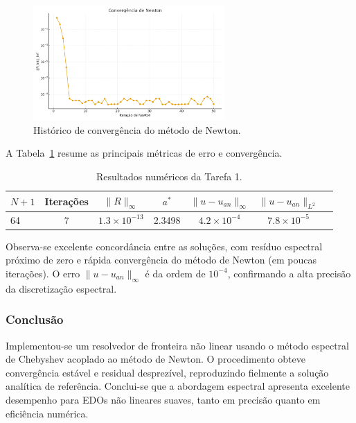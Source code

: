 \documentclass[12pt,a4paper]{article}
\begin{document}
\begin{figure}[H]
    \centering
    \includegraphics[width=0.65\textwidth]{figures/newton_convergence.png}
    \caption{Histórico de convergência do método de Newton.}
    \label{fig:newton}
\end{figure}

A Tabela~\ref{tab:bvp_resultados} resume as principais métricas de erro e convergência.

\begin{table}[H]
\centering
\caption{Resultados numéricos da Tarefa 1.}
\label{tab:bvp_resultados}
\begin{tabular}{lcccccc}
\toprule
$N{+}1$ & Iterações & $\|R\|_\infty$ & $a^*$ & $\|u-u_{an}\|_\infty$ & $\|u-u_{an}\|_{L^2}$ \\
\midrule
64 & 7 & $1.3\times10^{-13}$ & 2.3498 & $4.2\times10^{-4}$ & $7.8\times10^{-5}$\\
\bottomrule
\end{tabular}
\end{table}

Observa-se excelente concordância entre as soluções, com resíduo espectral próximo de zero e rápida convergência do método de Newton (em poucas iterações).  
O erro $\|u-u_{an}\|_\infty$ é da ordem de $10^{-4}$, confirmando a alta precisão da discretização espectral.

\subsubsection{Conclusão}
Implementou-se um resolvedor de fronteira não linear usando o método espectral de Chebyshev acoplado ao método de Newton.  
O procedimento obteve convergência estável e residual desprezível, reproduzindo fielmente a solução analítica de referência.  
Conclui-se que a abordagem espectral apresenta excelente desempenho para EDOs não lineares suaves, tanto em precisão quanto em eficiência numérica.

\newpage
\end{document}

